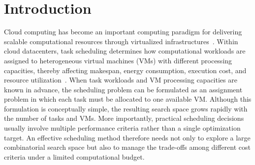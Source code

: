 \documentclass[pdflatex,onecolumn,sn-mathphys-num]{sn-jnl}
\begin{document}

\maketitle


\section{Introduction}

Cloud computing has become an important computing paradigm for delivering scalable computational resources through virtualized infrastructures~\cite{Armbrust2010,Buyya2009}. Within cloud datacenters, task scheduling determines how computational workloads are assigned to heterogeneous virtual machines (VMs) with different processing capacities, thereby affecting makespan, energy consumption, execution cost, and resource utilization~\cite{Coffman1976,Braun2001,Etminani2007}. When task workloads and VM processing capacities are known in advance, the scheduling problem can be formulated as an assignment problem in which each task must be allocated to one available VM. Although this formulation is conceptually simple, the resulting search space grows rapidly with the number of tasks and VMs. More importantly, practical scheduling decisions usually involve multiple performance criteria rather than a single optimization target. An effective scheduling method therefore needs not only to explore a large combinatorial search space but also to manage the trade-offs among different cost criteria under a limited computational budget.
\end{document}
